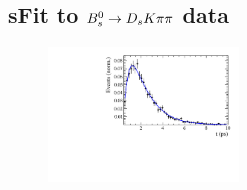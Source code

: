 \subsection{sFit to ${{B}^0_{s}}\rightarrow{\ensuremath{{D}_{s}}}{\ensuremath{K}}{\ensuremath{\pi}}{\ensuremath{\pi}}$ data}

\begin{figure}[h]
	\centering
		\includegraphics[width=0.45\textwidth, height = !]{figs/timeFit/signal/h_t.pdf} 
		\caption{} 		
\end{figure}	



